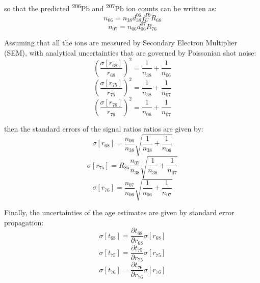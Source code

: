 \documentclass{article}
\begin{document}
so that the predicted \textsuperscript{206}Pb and
\textsuperscript{207}Pb ion counts can be written as:
\begin{equation}
    n_{06} = n_{38}d^{06}_{38}f^{Pb}_{U}R_{68}
\end{equation}
\begin{equation}  
    n_{07} = n_{06}d^{07}_{06}R_{76}
\end{equation}

Assuming that all the ions are measured by Secondary Electron
Multiplier (SEM), with analytical uncertainties that are governed by
Poissonian shot noise:
\begin{equation}
    \left(\frac{\sigma[r_{68}]}{r_{68}}\right)^2 =
    \frac{1}{n_{38}} + \frac{1}{n_{06}}
\end{equation}
\begin{equation}  
    \left(\frac{\sigma[r_{75}]}{r_{75}}\right)^2 =
    \frac{1}{n_{38}} + \frac{1}{n_{07}}
\end{equation}
\begin{equation}  
    \left(\frac{\sigma[r_{76}]}{r_{76}}\right)^2 =
    \frac{1}{n_{06}} + \frac{1}{n_{07}}
\end{equation}

then the standard errors of the signal ratios ratios are given by:
\begin{equation}
    \sigma[r_{68}] = \frac{n_{06}}{n_{38}}
    \sqrt{\frac{1}{n_{38}} + \frac{1}{n_{06}}}
\end{equation}
\begin{equation}  
    \sigma[r_{75}] = R_{85} \frac{n_{07}}{n_{38}}
    \sqrt{\frac{1}{n_{38}} + \frac{1}{n_{07}}}
\end{equation}
\begin{equation}  
    \sigma[r_{76}] = \frac{n_{07}}{n_{06}}
    \sqrt{\frac{1}{n_{06}} + \frac{1}{n_{07}}}
\end{equation}

Finally, the uncertainties of the age estimates are given by standard
error propagation:
\begin{equation}
    \sigma[t_{68}] = \frac{\partial{t_{68}}}{\partial{r_{68}}} \sigma[r_{68}]
\end{equation}
\begin{equation}  
    \sigma[t_{75}] = \frac{\partial{t_{75}}}{\partial{r_{75}}} \sigma[r_{75}]
\end{equation}
\begin{equation}  
    \sigma[t_{76}] = \frac{\partial{t_{76}}}{\partial{r_{76}}} \sigma[r_{76}]
\end{equation}
\end{document}
